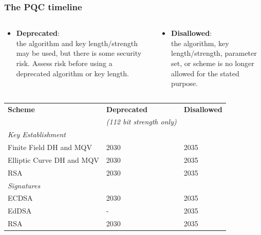 \documentclass[
aspectratio=169, %
t, %
onlytextwidth, %
10pt, %
]{beamer}
\begin{document}
\begin{frame}
    \frametitle{The PQC timeline}
    \begin{columns}
        \begin{column}{0.5\linewidth} %
            \begin{itemize}
                \item \textbf{Deprecated}: \\the algorithm and key length/strength may be used, but there is some security risk. Assess risk before using a deprecated algorithm or key length.
            \end{itemize}
        \end{column}
        \begin{column}{0.5\linewidth} %
            \begin{itemize}
                \item \textbf{Disallowed}: \\the algorithm, key length/strength, parameter set, or scheme is no longer allowed for the stated purpose.
            \end{itemize}
        \end{column}
    \end{columns}
    \begin{columns}
        \begin{column}{0.58\linewidth} %
        \vspace{-2em}
            \begin{table}[]
                \begin{tabular}{|l|l|l|}
                    \hline
                    \textbf{Scheme} & \textbf{Deprecated} & \textbf{Disallowed} \\
                                    & \textit{(112 bit strength only)}& \\
                    \hline
                    \textit{Key Establishment}&&\\
                    Finite Field DH and MQV & 2030 & 2035 \\
                    Elliptic Curve DH and MQV & 2030 & 2035 \\
                    RSA & 2030 & 2035 \\
                    \hline
                    \textit{Signatures}&&\\
                    ECDSA & 2030 & 2035 \\
                    EdDSA & - & 2035 \\
                    RSA & 2030 & 2035 \\

\end{tabular}
\end{table}
\end{column}
\end{columns}
\end{frame}
\end{document}
